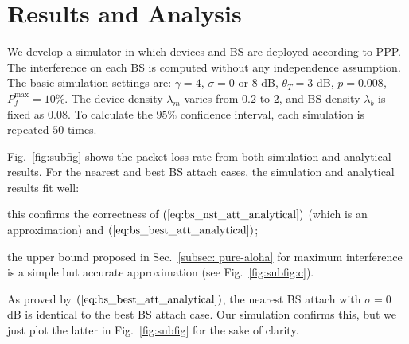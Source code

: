 \section{Results and Analysis}
\label{sec:simulation}
\begin{figure*}
	\hspace{-2.3em}
	\hspace{-2.1em}
	\caption{Network packet loss rate with respect to normalized load $p\lambda_{m}/\lambda_{b}$ (ANA=analytical, SIM=simulation)}
	\label{fig:subfig} %
	\vspace{-2em}
\end{figure*}
We develop a simulator in which devices and BS are deployed according to PPP. The interference on each BS is computed without any independence assumption. The basic simulation settings are: $\gamma=4$, $\sigma = 0$ or $8$ dB, $\theta_{T} =3$ dB, $p=0.008$, $P_{f}^{\text{max}}=10\%$. The device density $\lambda_m$ varies from $0.2$ to $2$, and BS density $\lambda_{b}$ is fixed as $0.08$. To calculate the $95\%$ confidence interval, each simulation is repeated $50$ times. 

Fig.~\ref{fig:subfig} shows the packet loss rate from both simulation and analytical results. For the nearest and best BS attach cases, the simulation and analytical results fit well:\begin{inparaenum}[i)]
	\item this confirms the correctness of $(\ref{eq:bs_nst_att_analytical})$ (which is an approximation) and $(\ref{eq:bs_best_att_analytical})$;
	\item the upper bound proposed in Sec.~\ref{subsec: pure-aloha} for maximum interference is a simple but accurate approximation (see Fig.~\ref{fig:subfig:c}).
\end{inparaenum} 
As proved by $(\ref{eq:bs_best_att_analytical})$, the nearest BS attach with $\sigma=0$ dB is identical to the best BS attach case. Our simulation confirms this, but we just plot the latter in Fig.~\ref{fig:subfig} for the sake of clarity. 


